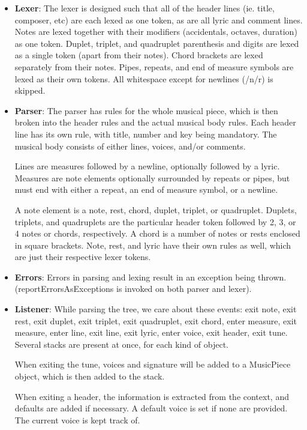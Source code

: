 \documentclass[12pt]{book}
\begin{document}
\begin{itemize}
\item {\bf Lexer}: The lexer is designed such that all of the header lines (ie. title, composer, etc) are each lexed as one token, as are all lyric and comment lines. Notes are lexed together with their modifiers (accidentals, octaves, duration) as one token. Duplet, triplet, and quadruplet parenthesis and digits are lexed as a single token (apart from their notes). Chord brackets are lexed separately from their notes. Pipes, repeats, and end of measure symbols are lexed as their own tokens. All whitespace except for newlines (/n/r) is skipped.

\item {\bf Parser}: The parser has rules for the whole musical piece, which is then broken into the header rules and the actual musical body rules. Each header line has its own rule, with title, number and key being mandatory. The musical body consists of either lines, voices, and/or comments. 

Lines are measures followed by a newline, optionally followed by a lyric. Measures are note elements optionally surrounded by repeats or pipes, but must end with either a repeat, an end of measure symbol, or a newline. 

A note element is a note, rest, chord, duplet, triplet, or quadruplet. Duplets, triplets, and quadruplets are the particular header token followed by 2, 3, or 4 notes or chords, respectively. A chord is a number of notes or rests enclosed in square brackets. Note, rest, and lyric have their own rules as well, which are just their respective lexer tokens.

\item {\bf Errors}: Errors in parsing and lexing result in an exception being thrown. (reportErrorsAsExceptions is invoked on both parser and lexer).

\item {\bf Listener}: While parsing the tree, we care about these events: exit note, exit rest, exit duplet, exit triplet, exit quadruplet, exit chord, enter measure, exit measure, enter line, exit line, exit lyric, enter voice, exit header, exit tune. Several stacks are present at once, for each kind of object.

When exiting the tune, voices and signature will be added to a MusicPiece object, which is then added to the stack.

When exiting a header, the information is extracted from the context, and defaults are added if necessary. A default voice is set if none are provided. The current voice is kept track of.


\end{itemize}
\end{document}
